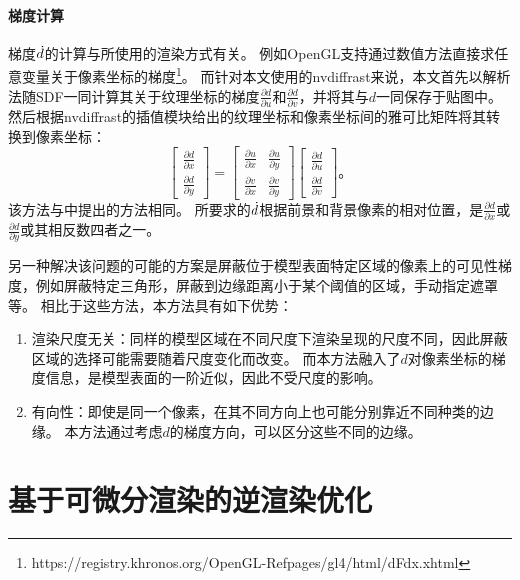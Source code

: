 \paragraph{梯度计算}
梯度$\dot d$的计算与所使用的渲染方式有关。
例如OpenGL支持通过数值方法直接求任意变量关于像素坐标的梯度\footnote{https://registry.khronos.org/OpenGL-Refpages/gl4/html/dFdx.xhtml}。
而针对本文使用的nvdiffrast来说，本文首先以解析法随SDF一同计算其关于纹理坐标的梯度$\frac{\partial d}{\partial u}$和$\frac{\partial d}{\partial v}$，并将其与$d$一同保存于贴图中。
然后根据nvdiffrast的插值模块给出的纹理坐标和像素坐标间的雅可比矩阵将其转换到像素坐标：
\begin{equation}
    \begin{bmatrix}
        \frac{\partial d}{\partial x} \\
        \frac{\partial d}{\partial y}
    \end{bmatrix} = \begin{bmatrix}
        \frac{\partial u}{\partial x} & \frac{\partial u}{\partial y} \\
        \frac{\partial v}{\partial x} & \frac{\partial v}{\partial y}
    \end{bmatrix} \begin{bmatrix}
        \frac{\partial d}{\partial u} \\
        \frac{\partial d}{\partial v}
    \end{bmatrix}
\text{。}
\end{equation}
该方法与\citet{sdf_glyphs}中提出的方法相同。
所要求的$\dot d$根据前景和背景像素的相对位置，是$\frac{\partial d}{\partial x}$或$\frac{\partial d}{\partial y}$或其相反数四者之一。

另一种解决该问题的可能的方案是屏蔽位于模型表面特定区域的像素上的可见性梯度，例如屏蔽特定三角形，屏蔽到边缘距离小于某个阈值的区域，手动指定遮罩等。
相比于这些方法，本方法具有如下优势：
\begin{enumerate}
\item 渲染尺度无关：同样的模型区域在不同尺度下渲染呈现的尺度不同，因此屏蔽区域的选择可能需要随着尺度变化而改变。
而本方法融入了$d$对像素坐标的梯度信息，是模型表面的一阶近似，因此不受尺度的影响。
\item 有向性：即使是同一个像素，在其不同方向上也可能分别靠近不同种类的边缘。
本方法通过考虑$d$的梯度方向，可以区分这些不同的边缘。
\end{enumerate}

\section{基于可微分渲染的逆渲染优化}

